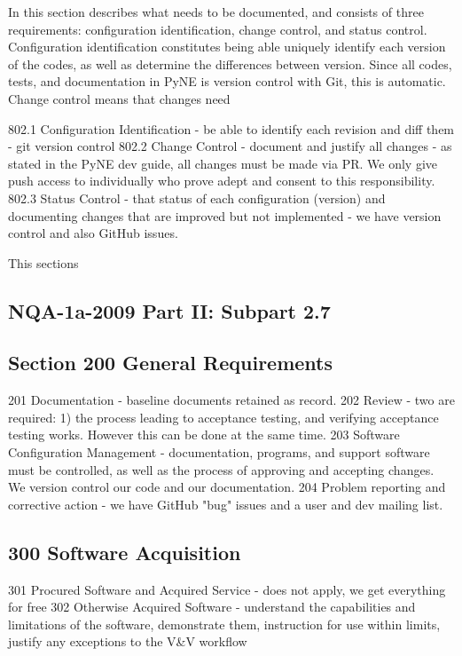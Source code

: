 \documentclass{anstrans}
\begin{document}
In this section describes what needs to be documented, and consists of three requirements: configuration identification, change control, and status control. Configuration identification constitutes being able uniquely identify each version of the codes, as well as determine the differences between version. Since all codes, tests, and documentation in PyNE is version control with Git, this is automatic. Change control means that changes need 

802.1 Configuration Identification - be able to identify each revision and diff them - git version control
802.2 Change Control - document and justify all changes - as stated in the PyNE dev guide, all changes must be made via PR. We only give push access to individually who prove adept and consent to this responsibility.
802.3 Status Control - that status of each configuration (version) and documenting changes that are improved but not implemented - we have version control and also GitHub issues.

This sections 



\subsection{NQA-1a-2009 Part II: Subpart 2.7}

\subsection{Section 200 General Requirements}

201 Documentation - baseline documents retained as record.
202 Review  - two are required: 1) the process leading to acceptance testing, and verifying acceptance testing works. However this can be done at the same time.
203 Software Configuration Management - documentation, programs, and support software must be controlled, as well as the process of approving and accepting changes. We version control our code and our documentation.
204 Problem reporting and corrective action - we have GitHub "bug" issues and a user and dev mailing list.

\subsection{300 Software Acquisition}
301 Procured Software and Acquired Service - does not apply, we get everything for free
302 Otherwise Acquired Software - understand the capabilities and limitations of the software, demonstrate them, instruction for use within limits, justify any exceptions to the V\&V workflow
\end{document}
